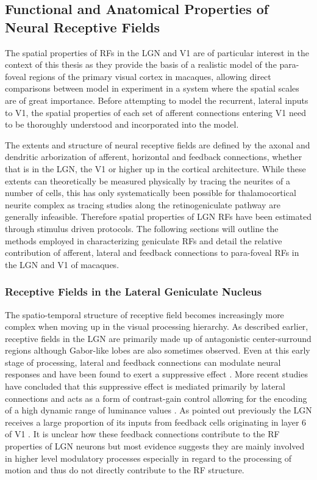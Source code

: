 \subsection{Functional and Anatomical Properties of Neural Receptive Fields}

The spatial properties of RFs in the LGN and V1 are of particular
interest in the context of this thesis as they provide the basis of a
realistic model of the para-foveal regions of the primary visual
cortex in macaques, allowing direct comparisons between model in
experiment in a system where the spatial scales are of great
importance. Before attempting to model the recurrent, lateral inputs
to V1, the spatial properties of each set of afferent connections
entering V1 need to be thoroughly understood and incorporated into the
model.

The extents and structure of neural receptive fields are defined by
the axonal and dendritic arborization of afferent, horizontal and
feedback connections, whether that is in the LGN, the V1 or higher up
in the cortical architecture. While these extents can theoretically be
measured physically by tracing the neurites of a number of cells, this
has only systematically been possible for thalamocortical
neurite complex as tracing studies along the retinogeniculate
pathway are generally infeasible. Therefore spatial properties of LGN
RFs have been estimated through stimulus driven protocols. The
following sections will outline the methods employed in characterizing
geniculate RFs and detail the relative contribution of afferent,
lateral and feedback connections to para-foveal RFs in the LGN and V1
of macaques.

\subsubsection{Receptive Fields in the Lateral Geniculate Nucleus}
\label{sec:LGNRF}


The spatio-temporal structure of receptive field becomes increasingly
more complex when moving up in the visual processing hierarchy. As
described earlier, receptive fields in the LGN are primarily made up
of antagonistic center-surround regions although Gabor-like lobes are
also sometimes observed. Even at this early stage of processing,
lateral and feedback connections can modulate neural responses and
have been found to exert a suppressive effect \citep{Hubel1961}. More
recent studies have concluded that this suppressive effect is mediated
primarily by lateral connections and acts as a form of contrast-gain
control allowing for the encoding of a high dynamic range of luminance
values \cite{Bonin2005}. As pointed out previously the LGN receives a
large proportion of its inputs from feedback cells originating in
layer 6 of V1 \citep{Sherman2002}. It is unclear how these feedback
connections contribute to the RF properties of LGN neurons but most
evidence suggests they are mainly involved in higher level modulatory
processes especially in regard to the processing of motion
\citep{Sillito2006} and thus do not directly contribute to the RF
structure.


